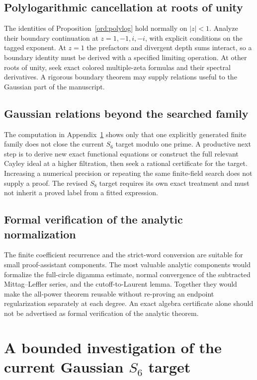 \subsection{Polylogarithmic cancellation at roots of unity}

The identities of Proposition~\ref{ord:polylog} hold normally on
$|z|<1$.  Analyze their boundary continuation at $z=1,-1,i,-i$,
with explicit conditions on the tagged exponent.  At $z=1$ the
prefactors and divergent depth sums interact, so a boundary identity
must be derived with a specified limiting operation.  At other roots
of unity, seek exact colored multiple-zeta formulas and their
spectral derivatives.  A rigorous boundary theorem may supply
relations useful to the Gaussian part of the manuscript.

\subsection{Gaussian relations beyond the searched family}

The computation in Appendix~\ref{app:s6} shows only that one
explicitly generated finite family does not close the current
$S_6$ target modulo one prime.  A productive next step is to derive
new exact functional equations or construct the full relevant
Cayley ideal at a higher filtration, then seek a rational
certificate for the target.  Increasing a numerical precision or
repeating the same finite-field search does not supply a proof.
The revised $S_8$ target requires its own exact treatment and must
not inherit a proved label from a fitted expression.

\subsection{Formal verification of the analytic normalization}

The finite coefficient recurrence and the strict-word conversion
are suitable for small proof-assistant components.  The most
valuable analytic components would formalize the full-circle
digamma estimate, normal convergence of the subtracted
Mittag--Leffler series, and the cutoff-to-Laurent lemma.
Together they would make the all-power theorem reusable without
re-proving an endpoint regularization separately at each degree.
An exact algebra certificate alone should not be advertised as
formal verification of the analytic theorem.

\appendix
\section{A bounded investigation of the current Gaussian \texorpdfstring{$S_6$}{S6} target}
\label{app:s6}

